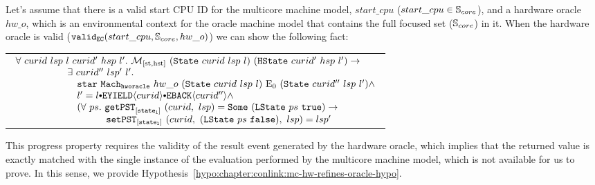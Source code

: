 \begin{lemma}
\label{lemma:chapter:conlink:mc-hw-refines-oracle-progress}

Let's assume that there is a valid start CPU ID for the multicore machine model, 
$start\_cpu$ ($start\_cpu \in {\mathbb{S}_{core}}$), and a hardware oracle $hw\_o$,  
which is an environmental context for the oracle machine model that contains the full focused set (${\mathbb{S}_{core}}$) in it.
When the hardware oracle is valid ($ {{\mathrm{\texttt{valid}}}_{{\mathrm{\texttt{EC}}}}}({start\_cpu}, {{\mathbb{S}_{core}}}, {hw\_o})$) we can show the following fact:
\begin{center}
\begin{tabular}{P{0.95\textwidth}}
$
\begin{array}{l}
\forall \ curid \ lsp \ l \ curid' \ hsp \ l' . \ \matchstatehstate{(\mcstate{curid}{lsp}{l})}{(\hstate{curid'}{hsp}{l'})} \rightarrow \\
\ \ \ \ \ \ \ \ \ \ \ \ \ \ \ \  \exists \ curid'' \ lsp' \ l'  . \ \\
\ \ \ \ \ \ \ \ \ \ \ \ \ \ \ \  \ \ \ \ccstarstep{\oraclestep{hw\_o}{(\mcstate{curid}{lsp}{l})}{\ccemptytrace}{(\mcstate{curid''}{lsp}{l'})}} \wedge\\
\ \ \ \ \ \ \ \ \ \ \ \ \ \ \ \  \ \ \ l' = \listconsoppo{\yieldbackev{curid''}}{\listconsoppo{\yieldev{curid}}{l}} \wedge\\
\ \ \ \ \ \ \ \ \ \ \ \ \ \ \ \  \ \ \ (\forall \ ps  . \ \getpstsome{\localstatekwd}{curid}{lsp}{(\localstate{ps}{\btrue})} \rightarrow \\
\ \ \ \ \ \ \ \ \ \ \ \ \ \ \ \  \ \ \ \ \ \ \ \ \ \  \ \ \setpst{\localstatekwd}{curid}{(\localstate{ps}{\bfalse})}{lsp}{lsp'} \\
\end{array}
$
\end{tabular}
\end{center}
\end{lemma}
This progress property requires the validity of the result event generated by the hardware oracle, which implies
that the returned value is exactly matched with the single instance of the evaluation performed 
by the multicore machine model, which is not available for us to prove. 
In this sense, we  provide Hypothesis~\ref{hypo:chapter:conlink:mc-hw-refines-oracle-hypo}.

